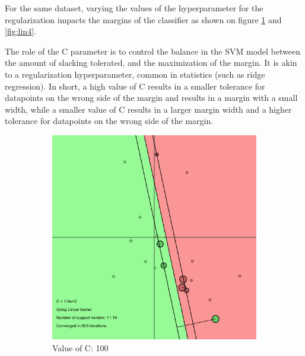 \documentclass[11pt, a4paper]{article}
\begin{document}
For the same dataset, varying the values of the hyperparameter for the
regularization impacts the margins of the classifier as shown on
figure \ref{fig:lin3} and \ref{fig:lin4}.


The role of the C parameter is to control the balance in the SVM model
between the amount of slacking tolerated, and the maximization of the
margin. It is akin to a regularization hyperparameter, common in
statistics (such as ridge regression). In short, a high value of C
results in a smaller tolerance for datapoints on the wrong side of the
margin and results in a margin with a small width, while a smaller
value of C results in a larger margin width and a higher tolerance for
datapoints on the wrong side of the margin. 

\begin{figure}[H]
    \centering
    \begin{subfigure}{.5\textwidth}
      \centering
      \includegraphics[width=0.9\linewidth]{1-2-1-linear_c_max.png}
      \caption{Value of C: 100}
      \label{fig:lin3}
    \end{subfigure}%
    \begin{subfigure}{.5\textwidth}
      \centering

\end{subfigure}
\end{figure}
\end{document}
